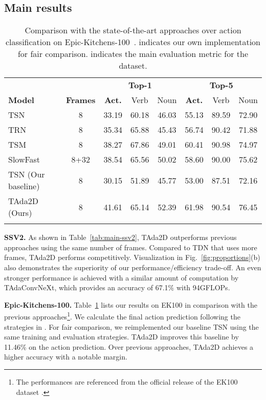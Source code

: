 \documentclass{article} \usepackage{iclr2022_conference,times}
\newcommand{\tablestyle}[2]{\setlength{\tabcolsep}{#1}\renewcommand{\arraystretch}{#2}\centering\small}
\begin{document}
\subsection{Main results}
\begin{table}[t]
\caption{Comparison with the state-of-the-art approaches over action classification on Epic-Kitchens-100~\citep{ek100}.  indicates our own implementation for fair comparison.  indicates the main evaluation metric for the dataset.}
\centering
\tablestyle{5.5pt}{1.0}
\begin{tabular}{lccccccc}
\shline
~ & ~ & \multicolumn{3}{c}{\bf Top-1} & \multicolumn{3}{c}{\bf Top-5} \\
\cmidrule(r){3-5}\cmidrule(r){6-8}
\bf Model & \bf Frames & \textbf{Act.} & Verb & Noun &\textbf{Act.} & Verb & Noun \\
\hline
TSN~\citep{tsn} & 8 & 33.19 & 60.18 & 46.03 & 55.13 & 89.59 & 72.90 \\
TRN~\citep{trn} & 8 & 35.34 & 65.88 & 45.43 & 56.74 & 90.42 & 71.88 \\ 
TSM~\citep{tsm} & 8 & 38.27 & 67.86 & 49.01 & 60.41 & 90.98 & 74.97 \\
SlowFast~\citep{slowfast} & 8+32 & 38.54 & 65.56 & 50.02 & 58.60 & 90.00 & 75.62 \\
\hline
TSN (Our baseline) & 8 & 30.15 & 51.89 & 45.77 & 53.00 & 87.51 & 72.16\\
TAda2D (Ours) & 8 & 41.61 & 65.14 & 52.39 & 61.98 & 90.54 & 76.45\\
\shline
\end{tabular}
\label{tab:epickitchensclassification}
\vspace{-2mm}
\end{table}

\textbf{SSV2.} As shown in Table~\ref{tab:main-ssv2}, 
TAda2D outperforms previous approaches using the same number of frames. 
Compared to TDN that uses more frames, TAda2D performs competitively.
Visualization in Fig.~\ref{fig:proportions}(b) also demonstrates the superiority of our performance/efficiency trade-off.
An even stronger performance is achieved with a similar amount of computation by TAdaConvNeXt, which provides an accuracy of 67.1\% with 94GFLOPs.

\textbf{Epic-Kitchens-100.} Table~\ref{tab:epickitchensclassification} lists our results on EK100 in comparison with the previous approaches\footnote{The performances are referenced from the official release of the EK100 dataset \citep{ek100}.}. 
We calculate the final action prediction following the strategies in \citet{vivitek100}.
For fair comparison, we reimplemented our baseline TSN using the same training and evaluation strategies. 
TAda2D improves this baseline by 11.46\% on the action prediction. 
Over previous approaches, TAda2D achieves a higher accuracy with a notable margin.
\end{document}
